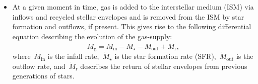 \documentclass[ms.tex]{subfiles}
\begin{document}
\begin{itemize}

	\item At a given moment in time, gas is added to the interstellar medium
	(ISM) via inflows and recycled stellar envelopes and is removed from the
	ISM by star formation and outflows, if present.
	This gives rise to the following differential equation describing the
	evolution of the gas-supply:
	\begin{equation}
	\label{eq:mdot_gas}
	\dot{M}_\text{g} = \dot{M}_\text{in} - \dot{M}_\star - \dot{M}_\text{out}
	+ \dot{M}_\text{r},
	\end{equation}
	where~$\dot{M}_\text{in}$ is the infall rate,~$\dot{M}_\star$ is the star
	formation rate (SFR),~$\dot{M}_\text{out}$ is the outflow rate,
	and~$\dot{M}_\text{r}$ describes the return of stellar envelopes from
	previous generations of stars.


\end{itemize}
\end{document}
